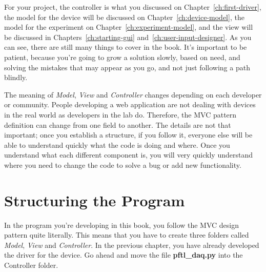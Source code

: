 For your project, the controller is what you discussed on Chapter~\ref{ch:first-driver}, the model for the device will be discussed on Chapter~\ref{ch:device-model}, the model for the experiment on Chapter~\ref{ch:experiment-model}, and the view will be discussed in Chapters~\ref{ch:starting-gui} and~\ref{ch:user-input-designer}. As you can see, there are still many things to cover in the book. It's important to be patient, because you're going to grow a solution slowly, based on need, and solving the mistakes that may appear as you go, and not just following a path blindly.


The meaning of \emph{Model}, \emph{View} and \emph{Controller} changes depending on each developer or community. People developing a web application are not dealing with devices in the real world as developers in the lab do. Therefore, the {MVC} pattern definition can change from one field to another. The details are not that important; once you establish a structure, if you follow it, everyone else will be able to understand quickly what the code is doing and where. Once you understand what each different component is, you will very quickly understand where you need to change the code to solve a bug or add new functionality.

\section{Structuring the Program}\label{sec:structure-of-theprogram}
In the program you're developing in this book, you follow the MVC design pattern quite literally. This means that you have to create three folders called \emph{Model}, \emph{View} and \emph{Controller}. In the previous chapter, you have already developed the driver for the device. Go ahead and move the file \textbf{pftl\_daq.py} into the Controller folder.


